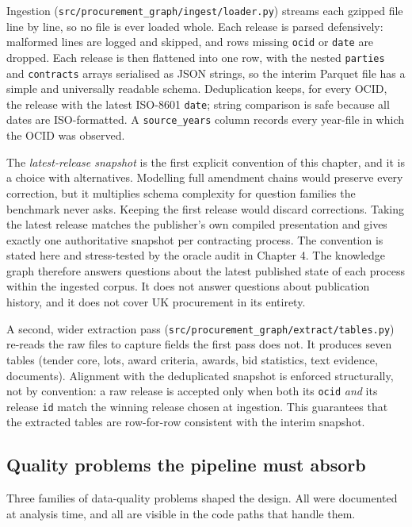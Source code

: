 Ingestion (\texttt{src/procurement\_graph/ingest/loader.py}) streams each gzipped file line by line, so no file is ever loaded whole. Each release is parsed defensively: malformed lines are logged and skipped, and rows missing \texttt{ocid} or \texttt{date} are dropped. Each release is then flattened into one row, with the nested \texttt{parties} and \texttt{contracts} arrays serialised as JSON strings, so the interim Parquet file has a simple and universally readable schema. Deduplication keeps, for every OCID, the release with the latest ISO-8601 \texttt{date}; string comparison is safe because all dates are ISO-formatted. A \texttt{source\_years} column records every year-file in which the OCID was observed.

The \emph{latest-release snapshot} is the first explicit convention of this chapter, and it is a choice with alternatives. Modelling full amendment chains would preserve every correction, but it multiplies schema complexity for question families the benchmark never asks. Keeping the first release would discard corrections. Taking the latest release matches the publisher's own compiled presentation and gives exactly one authoritative snapshot per contracting process. The convention is stated here and stress-tested by the oracle audit in Chapter 4. The knowledge graph therefore answers questions about the latest published state of each process within the ingested corpus. It does not answer questions about publication history, and it does not cover UK procurement in its entirety.

A second, wider extraction pass (\texttt{src/procurement\_graph/extract/tables.py}) re-reads the raw files to capture fields the first pass does not. It produces seven tables (tender core, lots, award criteria, awards, bid statistics, text evidence, documents). Alignment with the deduplicated snapshot is enforced structurally, not by convention: a raw release is accepted only when both its \texttt{ocid} \emph{and} its release \texttt{id} match the winning release chosen at ingestion. This guarantees that the extracted tables are row-for-row consistent with the interim snapshot.

\subsection{Quality problems the pipeline must absorb}\label{sec:quality-problems-the-pipeline-must-absor}

Three families of data-quality problems shaped the design. All were documented at analysis time, and all are visible in the code paths that handle them.

